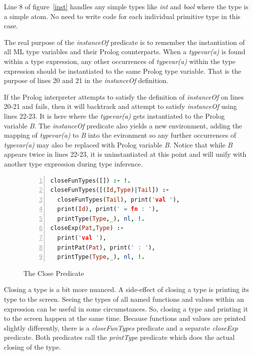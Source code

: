 \documentclass[10pt]{luthercs}
\begin{document}
Line 8 of figure~\ref{inst} handles any simple types like {\em int} and {\em bool} where the type is a simple atom. No need to write code for each individual primitive type in this case.

The real purpose of the {\em instanceOf} predicate is to remember the instantiation of all ML type variables and their Prolog counterparts. When a {\em typevar(a)} is found within a type expression, any other occurrences of {\em typevar(a)} within the type expression should be instantiated to the same Prolog type variable. That is the purpose of lines 20 and 21 in the {\em instanceOf} definition. 

If the Prolog interpreter attempts to satisfy the definition of {\em instanceOf} on lines 20-21 and fails, then it will backtrack and attempt to satisfy {\em instanceOf} using lines 22-23. It is here where the {\em typevar(a)} gets instantiated to the Prolog variable {\em B}. The {\em instanceOf} predicate also yields a new environment, adding the mapping of {\em typevar(a)} to {\em B} into the evironment so any further occurrences of {\em typevar(a)} may also be replaced with Prolog variable {\em B}. Notice that while {\em B} appears twice in lines 22-23, it is uninstantiated at this point and will unify with another type expression during type inference.

\begin{figure}[htbp]
\begin{lstlisting}[language=Prolog,numbers=left,numberstyle=\tiny]
closeFunTypes([]) :- !.
closeFunTypes([(Id,Type)|Tail]) :-
  closeFunTypes(Tail), print('val '), 
  print(Id), print(' = fn : '), 
  printType(Type,_), nl, !.
closeExp(Pat,Type) :-  
  print('val '), 
  printPat(Pat), print(' : '), 
  printType(Type,_), nl, !.
\end{lstlisting}
\caption{The Close Predicate}
\label{close}
\end{figure}

Closing a type is a bit more nuanced. A side-effect of closing a type is printing its type to the screen. Seeing the types of all named functions and values within an expression can be useful in some circumstances. So, closing a type and printing it to the screen happen at the same time. Because functions and values are printed slightly differently, there is a {\em closeFunTypes} predicate and a separate {\em closeExp} predicate. Both predicates call the {\em printType} predicate which does the actual closing of the type. 
\end{document}
